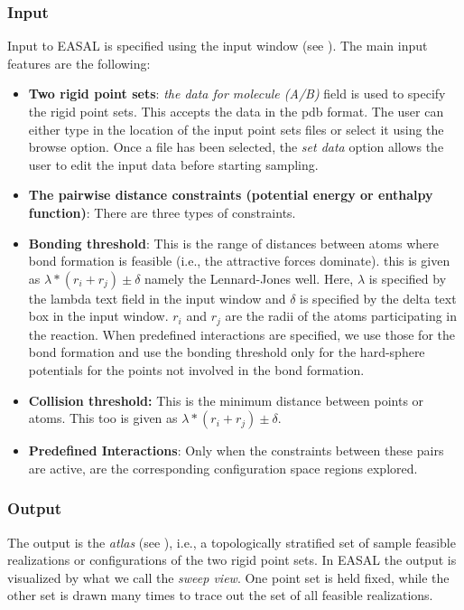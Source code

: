 \documentclass[10pt]{article}
\begin{document}
\subsubsection{Input}
Input to EASAL is specified using the input window (see ).
The main input features are the following:
\begin{itemize}
		\item \textbf{Two rigid point sets}: \emph{the data for molecule
		(A/B)} field is used to specify the rigid point sets. This accepts the
		data in the pdb format.  The user can either type in the location of
		the input point sets files or select it using the browse option. Once a
		file has been selected, the \emph{set data} option allows the user to edit
		the input data before starting sampling.
\item \textbf{The pairwise distance constraints (potential energy or enthalpy
		function)}: There are three types of constraints.

\item \textbf{Bonding threshold}: This is the range of distances between atoms
		where bond formation is feasible (i.e., the attractive forces dominate). 
		this is given as $\lambda*(r_i+r_j) 
		\pm \delta$ namely the Lennard-Jones well. 
		Here, $\lambda$ is specified by the lambda text field in
		the input window and $\delta$ is specified by the delta text box in the
		input window. $r_i$ and $r_j$ are the radii of the atoms participating
		in the reaction. When predefined interactions are specified, we use those
		for the bond formation and use the bonding threshold only for the hard-sphere
		potentials for the points not involved in the bond formation.

\item \textbf{Collision threshold:} This is the minimum distance between points or atoms. This too is given as $\lambda*(r_i+r_j)
		\pm \delta$.
		
\item \textbf{Predefined Interactions}: Only when the constraints between these pairs are active, are the corresponding configuration space regions explored. 
\end{itemize}

\subsubsection{Output}
The output is the \emph{atlas} (see ), i.e., a topologically stratified
set of sample feasible realizations or configurations of the two rigid point
sets. In EASAL the output is visualized by what we call the \emph{sweep view}. One
point set is  held fixed, while the other set is drawn many times to trace out
the set of all feasible realizations.
\end{document}
